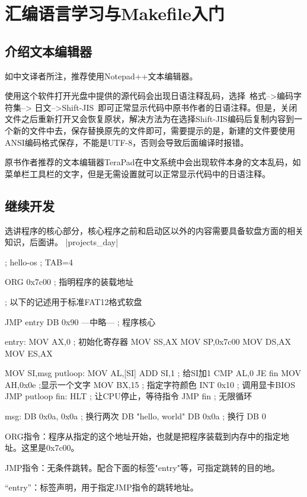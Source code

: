 ﻿\chapter{	汇编语言学习与Makefile入门	}
\section{	介绍文本编辑器	}
如中文译者所注，推荐使用Notepad++文本编辑器。

使用这个软件打开光盘中提供的源代码会出现日语注释乱码，选择~格式-->编码字符集--> 日文-->Shift-JIS~即可正常显示代码中原书作者的日语注释。但是，关闭文件之后重新打开又会恢复原状，解决方法为在选择Shift-JIS编码后复制内容到一个新的文件中去，保存替换原先的文件即可，需要提示的是，新建的文件要使用ANSI编码格式保存，不能是UTF-8，否则会导致后面编译时报错。

原书作者推荐的文本编辑器TeraPad在中文系统中会出现软件本身的文本乱码，如菜单栏工具栏的文字，但是无需设置就可以正常显示代码中的日语注释。

\section{	继续开发	}
选讲程序的核心部分，核心程序之前和启动区以外的内容需要具备软盘方面的相关知识，后面讲。
\dag |projects_day|
\begin{code}[label=helloos.nas]
; hello-os
; TAB=4

		ORG		0x7c00			; 指明程序的装载地址

; 以下的记述用于标准FAT12格式软盘

		JMP		entry
		DB		0x90
---中略---
; 程序核心

entry:
		MOV		AX,0			; 初始化寄存器
		MOV		SS,AX
		MOV		SP,0x7c00
		MOV		DS,AX
		MOV		ES,AX

		MOV		SI,msg
putloop:
		MOV		AL,[SI]
		ADD		SI,1			; 给SI加1
		CMP		AL,0
		JE		fin
		MOV		AH,0x0e			;显示一个文字
		MOV		BX,15			; 指定字符颜色
		INT		0x10			; 调用显卡BIOS
		JMP		putloop
fin:
		HLT						; 让CPU停止，等待指令
		JMP		fin				; 无限循环

msg:
		DB		0x0a, 0x0a		; 换行两次
		DB		"hello, world"
		DB		0x0a			; 换行
		DB		0
\end{code}
\cs

ORG指令：程序从指定的这个地址开始，也就是把程序装载到内存中的指定地址。这里是0x7c00。

JMP指令：无条件跳转。配合下面的标签"entry"等，可指定跳转的目的地。

“entry”：标签声明，用于指定JMP指令的跳转地址。


